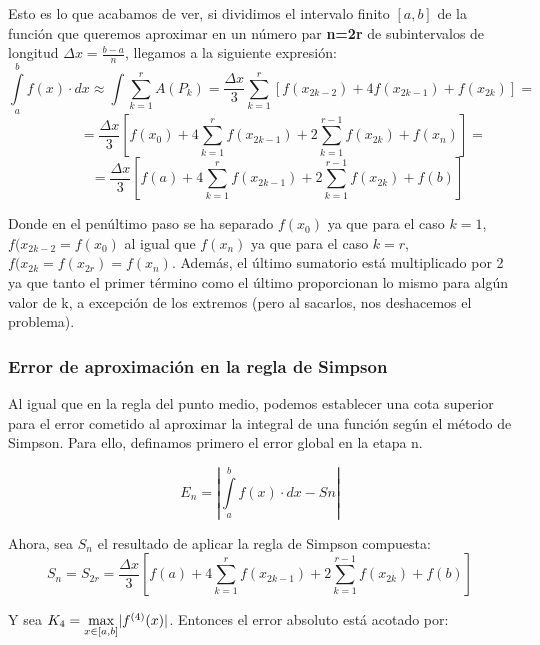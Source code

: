 \documentclass[12pt]{article}
\begin{document}
Esto es lo que acabamos de ver, si dividimos el intervalo finito $[a,b]$ de la función que queremos aproximar en un número par \textbf{n=2r} de subintervalos de longitud $\Delta x=\frac{b-a}{n}$, llegamos a la siguiente expresión:
\begin{equation*}
\int \limits_{a}^{b} f(x) \cdot dx \approx 
\int \sum_{k=1}^{r}A(P_k) =
\frac{\Delta x}{3}\sum_{k=1}^{r}[f(x_{2k-2})+4f(x_{2k-1})+f(x_{2k})] =
\end{equation*}
\begin{equation*}
\;\;\;\;\;\;\;\;\;\;\;\;
=\frac{\Delta x}{3}[f(x_0)+4\sum_{k=1}^{r}f(x_{2k-1})+2\sum_{k=1}^{r-1}f(x_{2k})+f(x_n)] =
\end{equation*}
\begin{equation}
\;\;\;\;\;\;\;\;\;
=\frac{\Delta x}{3}[f(a)+4\sum_{k=1}^{r}f(x_{2k-1})+2\sum_{k=1}^{r-1}f(x_{2k})+f(b)]
\end{equation}

Donde en el penúltimo paso se ha separado $f(x_0)$ ya que para el caso $k=1$, $f(x_{2k-2}=f(x_0)$ al igual que $f(x_n)$ ya que para el caso $k=r$, $f(x_{2k}=f(x_{2r})=f(x_n)$. Además, el último sumatorio está multiplicado por 2 ya que tanto el primer término como el último proporcionan lo mismo para algún valor de k, a excepción de los extremos (pero al sacarlos, nos deshacemos el problema).

\subsubsection{Error de aproximación en la regla de Simpson}

Al igual que en la regla del punto medio, podemos establecer una cota superior para el error cometido al aproximar la integral de una función según el método de Simpson. Para ello, definamos primero el error global en la etapa n.


\begin{equation}
E_n=\left |\displaystyle \int \limits_{a}^{b} f(x) \cdot dx - Sn\right |
\end{equation}

Ahora, sea $S_n$ el resultado de aplicar la regla de Simpson compuesta:
\begin{equation}
S_n = S_{2r} = \frac{\Delta x}{3}
[f(a)+4\sum_{k=1}^{r}f(x_{2k-1})+2\sum_{k=1}^{r-1}f(x_{2k})+f(b)]
\end{equation}

Y sea $K_4 = \smash{\displaystyle\max_{x \in [a,b]}} |f^{(4)}(x)|$. Entonces el error absoluto está acotado por:
\end{document}
